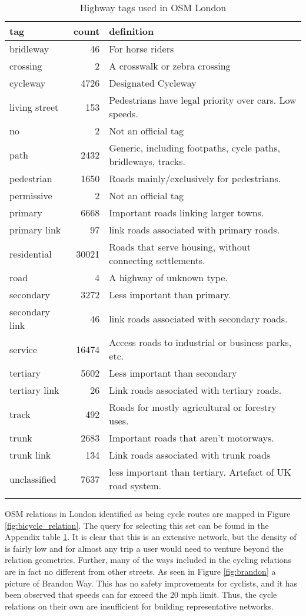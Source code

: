\begin{table}
\centering
\begin{tabular}{lrl}
\\ \toprule
tag & count & definition \\
\midrule
bridleway& 46 & For horse riders\\
crossing & 2 & A crosswalk or zebra crossing \\
cycleway & 4726 & Designated Cycleway\\
living street & 153 & Pedestrians have legal priority over cars. Low speeds.\\
no & 2 & Not an official tag \\
path & 2432 & Generic, including footpaths, cycle paths, bridleways, tracks. \\
pedestrian & 1650 & Roads mainly/exclusively for pedestrians.\\
permissive & 2 & Not an official tag\\
primary & 6668 & Important roads linking larger towns.\\
primary link & 97 & link roads associated with primary roads.\\
residential & 30021 & Roads that serve housing, without connecting settlements.\\
 road & 4 & A highway of unknown type. \\
secondary & 3272 & Less important than primary.\\
secondary link & 46 & link roads associated with secondary roads.\\
service & 16474 & Access roads to industrial or business parks, etc. \\
tertiary & 5602 & Less important than secondary\\
tertiary link & 26 & Link roads associated with tertiary roads. \\ 
track & 492 & Roads for mostly agricultural or forestry uses. \\
trunk & 2683 & Important roads that aren't motorways. \\
trunk link & 134 & Link roads associated with trunk roads \\
unclassified & 7637 & less important than tertiary. Artefact of UK road system.\\ 
\\ \bottomrule
\end{tabular}
\caption{Highway tags used in OSM London}
\label{table:osm_tags}
\end{table}


OSM relations in London identified as being cycle routes are mapped in Figure \ref{fig:bicycle_relation}. The query for selecting this set can be found in the Appendix table \ref{table:osm_tags}. It is clear that this is an extensive network, but the density of is fairly low and for almost any trip a user would need to venture beyond the relation geometries. Further, many of the ways included in the cycling relations are in fact no different from other streets. As seen in Figure \ref{fig:brandon} a picture of Brandon Way. This has no safety improvements for cyclists, and it has been observed that speeds can far exceed the 20 mph limit. Thus, the cycle relations on their own are insufficient for building representative networks. 

